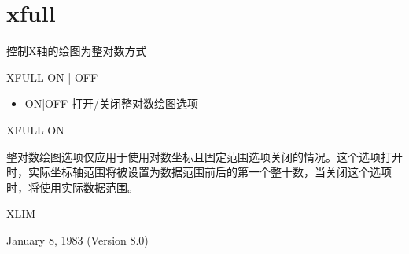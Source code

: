 \section{xfull}
\label{cmd:xfull}

控制X轴的绘图为整对数方式

XFULL ON | OFF

\begin{itemize}
\item ON|OFF 打开/关闭整对数绘图选项
\end{itemize}

XFULL ON

整对数绘图选项仅应用于使用对数坐标且固定范围选项关闭的情况。这个选项打开时，实际坐标轴范围将被设置为数据范围前后的第一个整十数，当关闭这个选项时，将使用实际数据范围。

XLIM

January 8, 1983 (Version 8.0)
